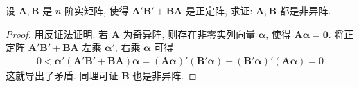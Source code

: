 \documentclass[../../main.tex]{subfiles}
\begin{document}
\begin{proposition}\label{proposition:两个正定阵和非异阵的关系}
设 \(\boldsymbol{A},\boldsymbol{B}\) 是 \(n\) 阶实矩阵, 使得 \(\boldsymbol{A}'\boldsymbol{B}'+\boldsymbol{B}\boldsymbol{A}\) 是正定阵, 求证: \(\boldsymbol{A},\boldsymbol{B}\) 都是非异阵.
\end{proposition}
\begin{proof}
用反证法证明. 若 \(\boldsymbol{A}\) 为奇异阵, 则存在非零实列向量 \(\boldsymbol{\alpha}\), 使得 \(\boldsymbol{A}\boldsymbol{\alpha}=\boldsymbol{0}\). 将正定阵 \(\boldsymbol{A}'\boldsymbol{B}'+\boldsymbol{B}\boldsymbol{A}\) 左乘 \(\boldsymbol{\alpha}'\), 右乘 \(\boldsymbol{\alpha}\) 可得
\begin{align*}
0<\boldsymbol{\alpha}'(\boldsymbol{A}'\boldsymbol{B}'+\boldsymbol{B}\boldsymbol{A})\boldsymbol{\alpha}=(\boldsymbol{A}\boldsymbol{\alpha})'(\boldsymbol{B}'\boldsymbol{\alpha})+(\boldsymbol{B}'\boldsymbol{\alpha})'(\boldsymbol{A}\boldsymbol{\alpha})= 0
\end{align*}
这就导出了矛盾. 同理可证 \(\boldsymbol{B}\) 也是非异阵. 

\end{proof}
\end{document}
